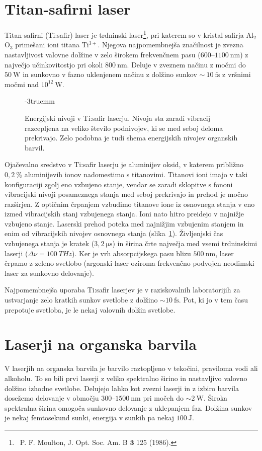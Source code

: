 \section{Titan-safirni laser}
Titan-safirni (Ti:safir) laser je trdninski laser\footnote{~P. F. Moulton, J. Opt. Soc. Am. B $\mathbf{3}$
125 (1986).}, pri katerem so v kristal safirja
Al$_2$O$_3$ primešani ioni titana Ti$^{3+}$. Njegova najpomembnejša značilnost je
zvezna nastavljivost valovne dolžine v zelo širokem frekvenčnem pasu 
($600$--$1100~\si{\nano\metre}$) z največjo učinkovitostjo pri okoli $800~\si{\nano\metre}$. Deluje
v zveznem načinu z močmi do $50~\si{\watt}$ in sunkovno  v fazno uklenjenem načinu 
z dolžino sunkov $\sim~10~\si{\femto\second}$ z vršnimi močmi nad $10^{12}~\si{\watt}$. 
\begin{figure}[ht]
\centering
\def\svgwidth{75truemm} 

\caption{Energijski nivoji v Ti:safir laserju. Nivoja sta zaradi vibracij
razcepljena na veliko število podnivojev, ki se med seboj deloma prekrivajo.
Zelo podobna je tudi shema energijskih nivojev organskih barvil. 
}
\label{fig:TiE}
\vglue-3truemm
\end{figure} 

Ojačevalno sredstvo v Ti:safir laserju je aluminijev oksid, v katerem 
približno $0,2~\%$ aluminijevih ionov nadomestimo s titanovimi. Titanovi ioni imajo 
v taki konfiguraciji zgolj eno vzbujeno stanje, vendar se zaradi sklopitve s fononi
vibracijski nivoji posameznega stanja med seboj prekrivajo in prehod je močno razširjen. 
Z optičnim črpanjem vzbudimo titanove ione iz osnovnega stanja v eno izmed vibracijskih 
stanj vzbujenega stanja. Ioni nato hitro preidejo v najnižje vzbujeno stanje. 
Laserski prehod poteka med najnižjim vzbujenim stanjem in enim od vibracijskih 
nivojev osnovnega stanja (slika~\ref{fig:TiE}). Življenjski čas
vzbujenega stanja je kratek ($3,2~\si{\micro\second}$) in širina črte največja med
vsemi trdninskimi laserji ($\Delta \nu =  100~\si{THz}$). 
Ker je vrh absorpcijskega pasu blizu $500~\si{\nano\metre}$,
laser črpamo z zeleno svetlobo (argonski laser oziroma
frekvenčno podvojen neodimski laser za sunkovno delovanje). 

Najpomembnejša uporaba Ti:safir laserjev je v raziskovalnih laboratorijih za ustvarjanje zelo 
kratkih sunkov svetlobe z dolžino $\sim 10~\si{\femto\second}$. Pot, ki jo 
v tem času prepotuje svetloba, je le nekaj valovnih dolžin svetlobe. 

\section{Laserji na organska barvila}
V laserjih na organska barvila je barvilo raztopljeno v tekočini, praviloma vodi ali alkoholu. 
To so bili prvi laserji z veliko spektralno širino in nastavljivo valovno dolžino
izhodne svetlobe. Delujejo lahko kot zvezni laserji in z izbiro barvila dosežemo
delovanje v območju $300$--$1500~\si{\nano\metre}$ pri močeh do $\sim 2~\si{\watt}$.
Široka spektralna širina omogoča sunkovno delovanje z uklepanjem faz. Dolžina sunkov je nekaj 
femtosekund sunki, energija v sunkih pa nekaj $100~\si{\joule}$.

